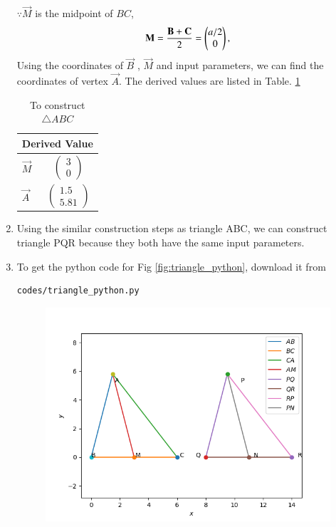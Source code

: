 \begin{enumerate}[label=\thesection.\arabic*.,ref=\thesection.\theenumi]
$\because \vec{M}$ is the midpoint of $BC$,
\begin{align}
\mathbf{M}= \frac{\mathbf{B}+\mathbf{C}}{2} =\begin{pmatrix}a/2\\0\end{pmatrix},
\label{eq:constr_m}
\end{align}
Using the coordinates of $\vec{B}$ , $\vec{M}$ and input parameters, we can find the coordinates of vertex $\vec{A}$. 
The derived values are listed in  
Table. \ref{table:table2} 
\begin{table}[ht!]
\centering
\begin{tabular}{ |p{2cm}|p{2cm}|  }
\hline
 \multicolumn{2}{|c|}{Derived Value} \\
\hline
$\vec{M}$ & $$\begin{pmatrix}3\\0\end{pmatrix}$$\\						
\hline
$\vec{A}$ & $$\begin{pmatrix}1.5\\5.81\end{pmatrix} $$\\
\hline
\end{tabular}
\caption{To construct $\triangle ABC$}
\label{table:table2}
\end{table}
%
\item Using the similar construction steps as triangle ABC, we can construct triangle PQR because they both have the same input parameters.
%
\\
\item To get the python code for Fig \ref{fig:triangle_python}, download it from
\begin{lstlisting}
codes/triangle_python.py
\end{lstlisting}
\begin{figure}[!ht]
\centering
\includegraphics[width= \columnwidth]{Figure_1.png}

\end{figure}
\end{enumerate}
